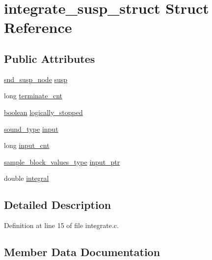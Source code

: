 \hypertarget{structintegrate__susp__struct}{}\section{integrate\+\_\+susp\+\_\+struct Struct Reference}
\label{structintegrate__susp__struct}
\subsection*{Public Attributes}
\begin{DoxyCompactItemize}
\item 
\hyperlink{sound_8h_a6b268203688a934bd798ceb55f85d4c0}{snd\+\_\+susp\+\_\+node} \hyperlink{structintegrate__susp__struct_ad92bbc2f599987fac17bd9f9132d26d3}{susp}
\item 
long \hyperlink{structintegrate__susp__struct_ab6d28d7c6107a765aa00e6eac8ee7f32}{terminate\+\_\+cnt}
\item 
\hyperlink{cext_8h_a7670a4e8a07d9ebb00411948b0bbf86d}{boolean} \hyperlink{structintegrate__susp__struct_a628ce2b054e50eb5667a46c698b9f9de}{logically\+\_\+stopped}
\item 
\hyperlink{sound_8h_a792cec4ed9d6d636d342d9365ba265ea}{sound\+\_\+type} \hyperlink{structintegrate__susp__struct_a36b7b3f37086a7b20a1b3ab4150fdfd4}{input}
\item 
long \hyperlink{structintegrate__susp__struct_abf1bd05943e48b7202057bd004e04cd4}{input\+\_\+cnt}
\item 
\hyperlink{sound_8h_a83d17f7b465d1591f27cd28fc5eb8a03}{sample\+\_\+block\+\_\+values\+\_\+type} \hyperlink{structintegrate__susp__struct_a47f94eabbd4f97bf5084dd5e46f1cd62}{input\+\_\+ptr}
\item 
double \hyperlink{structintegrate__susp__struct_a34072e8e3ef9b80ca3b6629402a4b1e9}{integral}
\end{DoxyCompactItemize}


\subsection{Detailed Description}


Definition at line 15 of file integrate.\+c.



\subsection{Member Data Documentation}
